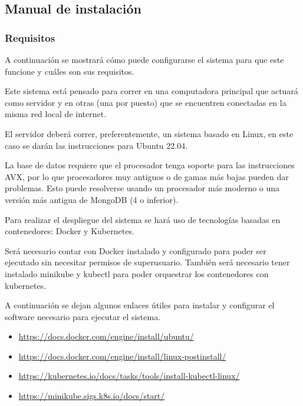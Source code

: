 \documentclass{article}
\begin{document}
\newpage
\subsection{Manual de instalación}
\subsubsection{Requisitos}
A continuación se mostrará cómo puede configurarse el sistema para que este funcione y cuáles son sus requisitos.

Este sistema está pensado para correr en una computadora principal que actuará como servidor y en otras (una por puesto) que se encuentren conectadas en la misma red local de internet.

El servidor deberá correr, preferentemente, un sistema basado en Linux, en este caso se darán las instrucciones para Ubuntu 22.04.

La base de datos requiere que el procesador tenga soporte para las instrucciones AVX, por lo que procesadores muy antiguos o de gamas más bajas pueden dar problemas. Esto puede resolverse usando un procesador más moderno o una versión más antigua de MongoDB (4 o inferior).

Para realizar el despliegue del sistema se hará uso de tecnologías basadas en contenedores: Docker y Kubernetes.

Será necesario contar con Docker instalado y configurado para poder ser ejecutado sin necesitar permisos de superusuario. También será necesario tener instalado minikube y kubectl para poder orquestrar los contenedores con kubernetes.

A continuación se dejan algunos enlaces útiles para instalar y configurar el software necesario para ejecutar el sistema.

\begin{itemize}
    \item \href{https://docs.docker.com/engine/install/ubuntu/}{https://docs.docker.com/engine/install/ubuntu/}
    \item \href{https://docs.docker.com/engine/install/linux-postinstall/}{https://docs.docker.com/engine/install/linux-postinstall/}
    \item \href{https://kubernetes.io/docs/tasks/tools/install-kubectl-linux/}{https://kubernetes.io/docs/tasks/tools/install-kubectl-linux/}
    \item \href{https://minikube.sigs.k8s.io/docs/start/}{https://minikube.sigs.k8s.io/docs/start/}
\end{itemize}
\end{document}
